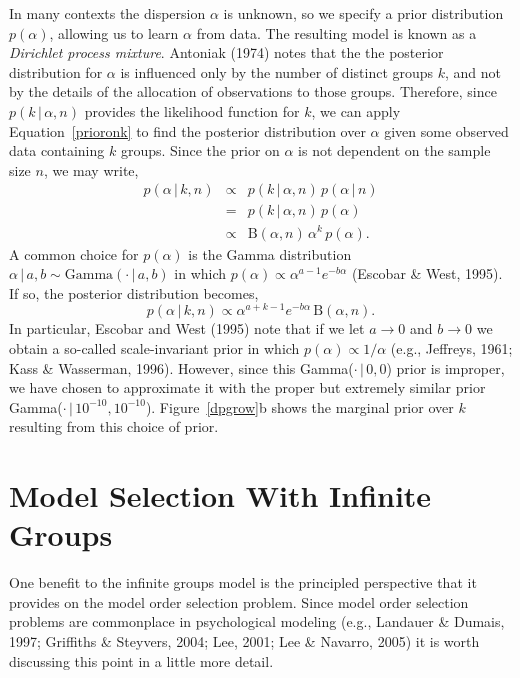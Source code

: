 \documentclass[authoryear]{elsarticle}
\newcommand{\condon}{\,|\,}
\newcommand{\panel}[1]{#1}
\newcommand{\prepost}{p}
\begin{document}
In many contexts the dispersion $\alpha$ is unknown, so we specify a prior distribution
$p(\alpha)$,  allowing us to learn $\alpha$ from data. The resulting model is known as
a {\it Dirichlet process mixture}. Antoniak (1974) notes that the the posterior distribution
for $\alpha$ is influenced only by the number of distinct groups $k$, and not by the
details of the allocation of observations to those groups. Therefore, since
$p(k \condon \alpha, n)$  provides the likelihood function for $k$, we can apply
Equation~\ref{prioronk} to find the posterior distribution over $\alpha$ given some
observed data containing $k$ groups. Since the prior on $\alpha$ is not dependent on
the sample size $n$, we may write,
\begin{eqnarray}
        p(\alpha \condon k, n)
        &\propto& p(k \condon \alpha, n) \,  p(\alpha \condon n) \nonumber \\
        &=& p(k \condon \alpha, n) \,  p(\alpha) \nonumber \\
        &\propto& \mathrm{B}(\alpha,n) \,  \alpha^k \, p(\alpha). \label{agrow}
\end{eqnarray}
A common choice for $\prepost(\alpha)$ is the Gamma distribution
$\alpha \condon a,b \sim \mbox{Gamma}(\cdot \condon a,b)$ in which
$\prepost(\alpha) \propto \alpha^{a-1}e^{-b\alpha}$ (Escobar \& West, 1995).
If so, the posterior distribution becomes,
\begin{equation}
        \label{gampri}
        p(\alpha \condon k,n) \propto
        \alpha^{a+k-1} e^{-b\alpha} \, \mathrm{B}(\alpha,n).
\end{equation}
In particular, Escobar and West (1995) note that if we let  $a \rightarrow 0$ and
$b \rightarrow 0$ we obtain a so-called scale-invariant prior in which
$p(\alpha) \propto 1/\alpha$ (e.g., Jeffreys, 1961; Kass \& Wasserman, 1996).
However,
since this Gamma($\cdot \condon 0,0$) prior is improper, we have chosen to
approximate it with the proper but extremely similar prior Gamma($\cdot \condon
10^{-10}, 10^{-10}$). Figure~\ref{dpgrow}\panel{b} shows the marginal
prior over $k$ resulting from this choice of prior.

\section{Model Selection With Infinite Groups}

One benefit to the infinite groups model is the principled perspective
that it provides on the model order selection problem. Since model
order selection problems are commonplace in psychological modeling
(e.g., Landauer \& Dumais, 1997; Griffiths \& Steyvers, 2004;
Lee, 2001; Lee \& Navarro, 2005) it is worth discussing this point
in a little more detail.
\end{document}
